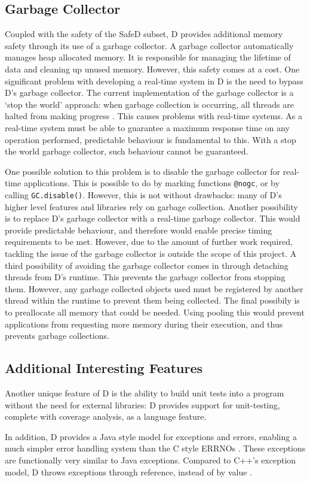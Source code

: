\subsection{Garbage Collector}
Coupled with the safety of the SafeD subset, D provides additional memory
safety through its use of a garbage collector. A garbage collector
automatically manages heap allocated memory. It is responsible for managing
the lifetime of data and cleaning up unused memory. 
However, this safety comes at a cost. One significant problem with developing a 
real-time system in D is the need to bypass D's garbage collector. 
The current implementation of the garbage 
collector is a `stop the world' approach: when garbage collection is occurring, 
all threads are halted from making progress 
\cite{dlang-garbage}. This causes problems with 
real-time systems. As a real-time system must be able to guarantee a maximum response 
time on any operation performed, predictable behaviour is fundamental to this. 
With a stop the world garbage collector, such behaviour cannot be guaranteed. 
\par\bigskip\noindent
One possible solution to this problem is to disable the garbage collector for 
real-time applications. This is possible to do by marking functions \texttt{@nogc}, 
or by calling \texttt{GC.disable()}. However, this is not without drawbacks: 
many of D's higher level features and libraries rely on garbage collection. 
Another possibility is to replace D's garbage collector with a real-time 
garbage collector. This would provide predictable behaviour, and therefore
would enable precise timing requirements to be met.
However, due to the amount of further work required, tackling the issue of the garbage 
collector is outside the scope of this project.
A third possibility of avoiding the garbage collector comes in through
detaching threads from D's runtime. This prevents the garbage collector from
stopping them. However, any garbage collected objects used must be registered
by another thread within the runtime to prevent them being collected. 
The final possibily is to preallocate all memory that could be needed. Using
pooling this would prevent applications from requesting more memory during
their execution, and thus prevents garbage collections. 

\subsection{Additional Interesting Features}
Another unique feature of D is the ability to build unit tests into a 
program without the need for external libraries: D provides support for 
unit-testing, complete with coverage analysis, as a language feature. 
\par\bigskip\noindent
In addition, D provides a Java style model for exceptions and errors, enabling 
a much simpler error handling system than the C style ERRNOs 
\cite{ddili-book}. 
These exceptions are functionally very similar to Java exceptions. Compared to
C++'s exception model, D throws exceptions through reference, instead of by
value \cite{interface-to-cpp}. 


